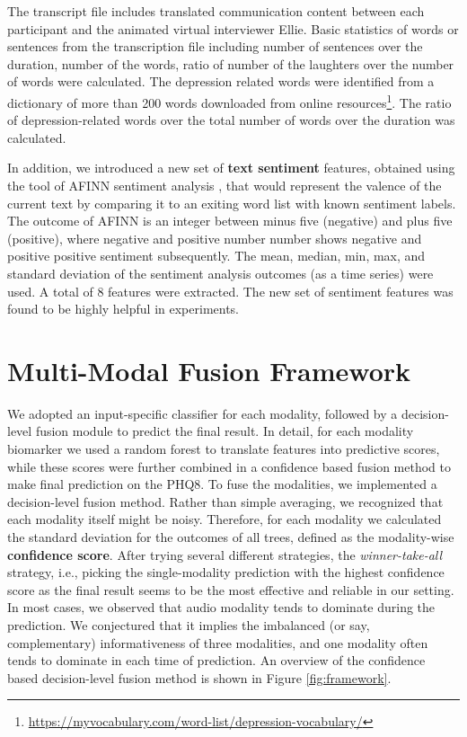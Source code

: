\documentclass[letterpaper]{article} %
\begin{document}
The transcript file includes translated communication content between each participant and the animated virtual interviewer Ellie. Basic statistics of words or sentences from the transcription file including number of sentences over the duration, number of the words, ratio of number of the laughters over the number of words were calculated. The depression related words were identified from a dictionary of more than 200 words downloaded from online resources\footnote{\url{https://myvocabulary.com/word-list/depression-vocabulary/}}. The ratio of depression-related words over the total number of words over the duration was calculated.  

In addition, we introduced a new set of \textbf{text sentiment} features, obtained using the tool of AFINN sentiment analysis \cite{nielsen2011new}, that would represent the valence of the current text by comparing it to an exiting word list with known sentiment labels. The outcome of AFINN is an integer between minus five (negative) and plus five (positive), where negative and positive number number shows negative and positive positive sentiment subsequently. The mean, median, min, max, and standard deviation of the sentiment analysis outcomes (as a time series) were used. A total of 8 features were extracted. The new set of sentiment features was found to be highly helpful in experiments.

\section{Multi-Modal Fusion Framework}

We adopted an input-specific classifier for each modality, followed by a decision-level fusion module to predict the final result. In detail, for each modality biomarker we used a random forest to translate features into predictive scores, while these scores were further combined in a confidence based fusion method to make final prediction on the PHQ8. To fuse the modalities, we implemented a decision-level fusion method. Rather than simple averaging, we recognized that each modality itself might be noisy. Therefore, for each modality we calculated the standard deviation for the outcomes of all trees, defined as the modality-wise \textbf{confidence score}. After trying several different strategies, the \textit{winner-take-all} strategy, i.e., picking the single-modality prediction with the highest confidence score as the final result seems to be the most effective and reliable in our setting. In most cases, we observed that audio modality tends to dominate during the prediction. We conjectured that it implies the imbalanced (or say, complementary) informativeness of three modalities, and one modality often tends to dominate in each time of prediction. An overview of the confidence based decision-level fusion method is shown in Figure \ref{fig:framework}.
\end{document}
